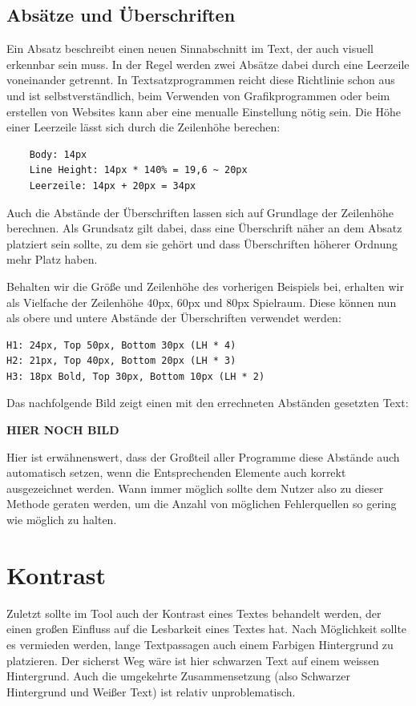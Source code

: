 \subsection{Absätze und Überschriften}
Ein Absatz beschreibt einen neuen Sinnabschnitt im Text, der auch visuell erkennbar sein muss. In der Regel werden zwei Absätze dabei durch eine Leerzeile voneinander getrennt. In Textsatzprogrammen reicht diese Richtlinie schon aus und ist selbstverständlich, beim Verwenden von Grafikprogrammen oder beim erstellen von Websites kann aber eine menualle Einstellung nötig sein. Die Höhe einer Leerzeile lässt sich durch die Zeilenhöhe berechen:

\begin{lstlisting}
	Body: 14px
	Line Height: 14px * 140% = 19,6 ~ 20px
	Leerzeile: 14px + 20px = 34px
\end{lstlisting}

Auch die Abstände der Überschriften lassen sich auf Grundlage der Zeilenhöhe berechnen. Als Grundsatz gilt dabei, dass eine Überschrift näher an dem Absatz platziert sein sollte, zu dem sie gehört und dass Überschriften höherer Ordnung mehr Platz haben.

Behalten wir die Größe und Zeilenhöhe des vorherigen Beispiels bei, erhalten wir als Vielfache der Zeilenhöhe 40px, 60px und 80px Spielraum. Diese können nun als obere und untere Abstände der Überschriften verwendet werden:

\begin{lstlisting}
H1: 24px, Top 50px, Bottom 30px (LH * 4)
H2: 21px, Top 40px, Bottom 20px (LH * 3)
H3: 18px Bold, Top 30px, Bottom 10px (LH * 2)
\end{lstlisting}

Das nachfolgende Bild zeigt einen mit den errechneten Abständen gesetzten Text:

\textbf{HIER NOCH BILD}

Hier ist erwähnenswert, dass der Großteil aller Programme diese Abstände auch automatisch setzen, wenn die Entsprechenden Elemente auch korrekt ausgezeichnet werden. Wann immer möglich sollte dem Nutzer also zu dieser Methode geraten werden, um die Anzahl von möglichen Fehlerquellen so gering wie möglich zu halten.



\section{Kontrast}
Zuletzt sollte im Tool auch der Kontrast eines Textes behandelt werden, der einen großen Einfluss auf die Lesbarkeit eines Textes hat.
Nach Möglichkeit sollte es vermieden werden, lange Textpassagen auch einem Farbigen Hintergrund zu platzieren.
Der sicherst Weg wäre ist hier schwarzen Text auf einem weissen Hintergrund. Auch die umgekehrte Zusammensetzung (also Schwarzer Hintergrund und Weißer Text) ist relativ unproblematisch.

